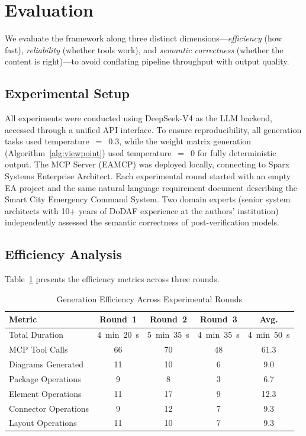 \documentclass{ieeeaccess}
\begin{document}
\section{Evaluation}
\label{sec:evaluation}

We evaluate the framework along three distinct dimensions---\emph{efficiency} (how fast), \emph{reliability} (whether tools work), and \emph{semantic correctness} (whether the content is right)---to avoid conflating pipeline throughput with output quality.

\subsection{Experimental Setup}

All experiments were conducted using DeepSeek-V4 as the LLM backend, accessed through a unified API interface. To ensure reproducibility, all generation tasks used temperature~$=$~0.3, while the weight matrix generation (Algorithm~\ref{alg:viewpoint}) used temperature~$=$~0 for fully deterministic output. The MCP Server (EAMCP) was deployed locally, connecting to Sparx Systems Enterprise Architect. Each experimental round started with an empty EA project and the same natural language requirement document describing the Smart City Emergency Command System. Two domain experts (senior system architects with 10+ years of DoDAF experience at the authors' institution) independently assessed the semantic correctness of post-verification models.

\subsection{Efficiency Analysis}

Table~\ref{tab:efficiency} presents the efficiency metrics across three rounds.

\begin{table}[h]
\centering
\caption{Generation Efficiency Across Experimental Rounds}
\label{tab:efficiency}
\begin{tabular}{lcccc}
\toprule
\textbf{Metric} & \textbf{Round~1} & \textbf{Round~2} & \textbf{Round~3} & \textbf{Avg.} \\
\midrule
Total Duration & 4~min~20~s & 5~min~35~s & 4~min~35~s & 4~min~50~s \\
MCP Tool Calls & 66 & 70 & 48 & 61.3 \\
Diagrams Generated & 11 & 10 & 6 & 9.0 \\
Package Operations & 9 & 8 & 3 & 6.7 \\
Element Operations & 11 & 17 & 9 & 12.3 \\
Connector Operations & 9 & 12 & 7 & 9.3 \\
Layout Operations & 11 & 10 & 7 & 9.3 \\
\bottomrule
\end{tabular}
\end{table}
\end{document}
